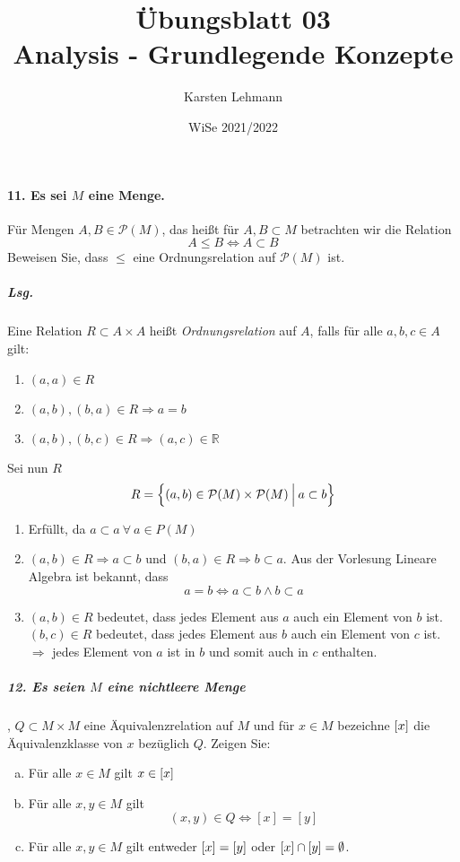 \documentclass{scrreprt}
\author{Karsten Lehmann}
\date{WiSe 2021/2022}
\title{Übungsblatt 03\\Analysis - Grundlegende Konzepte}
\begin{document}
\paragraph{11. Es sei $M$ eine Menge.}
Für Mengen $A, B \in \mathcal{P}(M)$, das heißt für $A, B \subset M$ betrachten
wir die Relation
\[
  A \leq B \iff A \subset B
\]
Beweisen Sie, dass $\leq$ eine Ordnungsrelation auf $\mathcal{P}(M)$ ist.

\subparagraph{Lsg.} Eine Relation $R \subset A \times A$ heißt
\emph{Ordnungsrelation} auf $A$, falls für alle $a, b, c \in A$ gilt:
\begin{enumerate}[1)]
\item $(a, a) \in R$
\item $(a, b), (b, a) \in R \Rightarrow a = b$
\item $(a, b), (b, c) \in R \Rightarrow (a, c) \in \mathbb{R}$
\end{enumerate}

Sei nun $R$
\[
  R = \qty\Big{(a, b) \in \mathcal{P}(M) \times \mathcal{P}(M) \: {\Big |} \: a \subset b}
\]
\begin{enumerate}[1)]
\item Erfüllt, da $a \subset a \: \forall \: a \in P(M)$
\item $(a, b) \in R \Rightarrow a \subset b$ und
  $(b, a) \in R \Rightarrow b \subset a$.
  Aus der Vorlesung Lineare Algebra ist bekannt, dass
  \[
    a = b \iff a \subset b \land b \subset a
  \]
\item $(a, b) \in R$ bedeutet, dass jedes Element aus $a$ auch ein Element von
  $b$ ist.
  $(b, c) \in R$ bedeutet, dass jedes Element aus $b$ auch ein Element von $c$
  ist.
  $\Rightarrow$ jedes Element von $a$ ist in $b$ und somit auch in $c$ enthalten.
\end{enumerate}

\subparagraph{12. Es seien $M$ eine nichtleere Menge}, $Q \subset M \times M$ eine
Äquivalenzrelation auf $M$ und für $x \in M$ bezeichne $\qty[x]$ die
Äquivalenzklasse von $x$ bezüglich $Q$.
Zeigen Sie:
\begin{enumerate}[(a)]
\item Für alle $x \in M$ gilt $x \in \qty[x]$
\item Für alle $x, y \in M$ gilt
  \[
    (x, y) \in Q \iff [x] = [y]
  \]
\item Für alle $x, y \in M$ gilt entweder $\qty[x] = \qty[y]$ oder
  $\qty[x] \cap \qty[y] = \emptyset$.
\end{enumerate}
\end{document}
